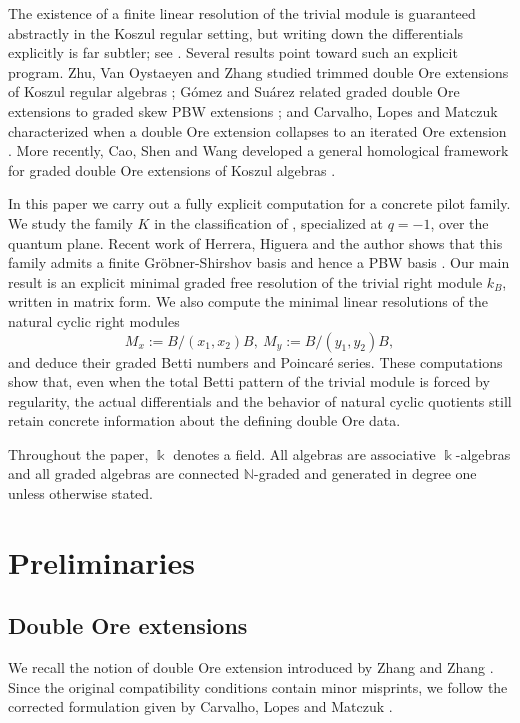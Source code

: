 \documentclass[reqno]{amsart}
\numberwithin{equation}{section}
\theoremstyle{definition}
\begin{document}
The existence of a finite linear resolution of the trivial module is guaranteed abstractly in the Koszul regular setting, but writing down the differentials explicitly is far subtler; see \cite{Pri70,PP05}. Several results point toward such an explicit program. Zhu, Van Oystaeyen and Zhang studied trimmed double Ore extensions of Koszul regular algebras \cite{ZVZ17}; G\'omez and Su\'arez related graded double Ore extensions to graded skew PBW extensions \cite{GS20}; and Carvalho, Lopes and Matczuk characterized when a double Ore extension collapses to an iterated Ore extension \cite{CLM11}. More recently, Cao, Shen and Wang developed a general homological framework for graded double Ore extensions of Koszul algebras \cite{CSW25}.

In this paper we carry out a fully explicit computation for a concrete pilot family. We study the family \(K\) in the classification of \cite{ZZ09}, specialized at \(q=-1\), over the quantum plane. Recent work of Herrera, Higuera and the author shows that this family admits a finite Gr\"obner-Shirshov basis and hence a PBW basis \cite{HHR25}. Our main result is an explicit minimal graded free resolution of the trivial right module \(k_B\), written in matrix form. We also compute the minimal linear resolutions of the natural cyclic right modules
\[
M_x:=B/(x_1,x_2)B, \ M_y:=B/(y_1,y_2)B,
\]
and deduce their graded Betti numbers and Poincar\'e series. These computations show that, even when the total Betti pattern of the trivial module is forced by regularity, the actual differentials and the behavior of natural cyclic quotients still retain concrete information about the defining double Ore data.

Throughout the paper, \(\Bbbk\) denotes a field. All algebras are associative \(\Bbbk\)-algebras and all graded algebras are connected \(\mathbb{N}\)-graded and generated in degree one unless otherwise stated.

\section{Preliminaries}

\subsection{Double Ore extensions}

We recall the notion of double Ore extension introduced by Zhang and Zhang \cite{ZZ08}. Since the original compatibility conditions contain minor misprints, we follow the corrected formulation given by Carvalho, Lopes and Matczuk \cite{CLM11}.
\end{document}
